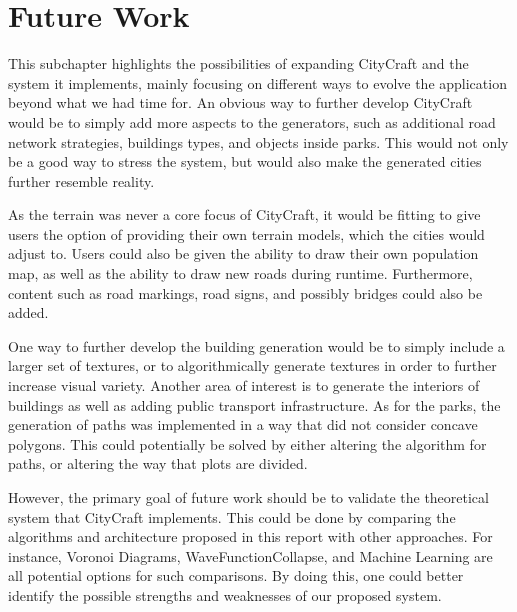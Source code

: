 \section{Future Work}
This subchapter highlights the possibilities of expanding CityCraft and the system it implements, mainly focusing on different ways to evolve the application beyond what we had time for.
An obvious way to further develop CityCraft would be to simply add more aspects to the generators, such as additional road network strategies, buildings types, and objects inside parks.
This would not only be a good way to stress the system, but would also make the generated cities further resemble reality.
 
As the terrain was never a core focus of CityCraft, it would be fitting to give users the option of providing their own terrain models, which the cities would adjust to.
Users could also be given the ability to draw their own population map, as well as the ability to draw new roads during runtime.
Furthermore, content such as road markings, road signs, and possibly bridges could also be added.
  
One way to further develop the building generation would be to simply include a larger set of textures, or to algorithmically generate textures in order to further increase visual variety.
Another area of interest is to generate the interiors of buildings as well as adding public transport infrastructure.
As for the parks, the generation of paths was implemented in a way that did not consider concave polygons.
This could potentially be solved by either altering the algorithm for paths, or altering the way that plots are divided.

However, the primary goal of future work should be to validate the theoretical system that CityCraft implements.
This could be done by comparing the algorithms and architecture proposed in this report with other approaches.
For instance, Voronoi Diagrams, WaveFunctionCollapse, and Machine Learning are all potential options for such comparisons.
By doing this, one could better identify the possible strengths and weaknesses of our proposed system.
